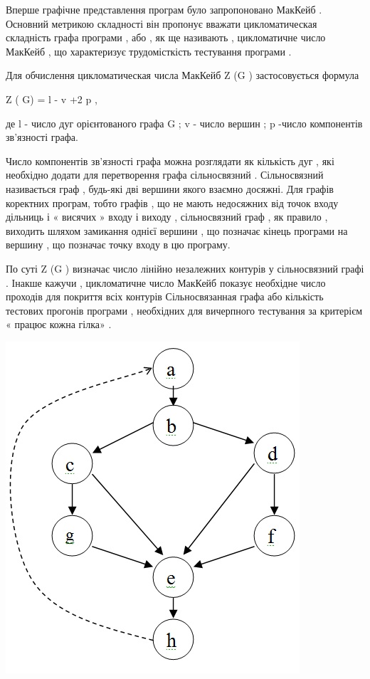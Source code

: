 \documentclass[oneside,final,14pt]{extreport}
\begin{document}
Вперше графічне представлення програм було запропоновано МакКейб . Основний метрикою складності він пропонує вважати цикломатическая складність графа програми , або , як ще називають , цикломатичне число МакКейб , що характеризує трудомісткість тестування програми .

Для обчислення цикломатическая числа МакКейб Z (G ) застосовується формула

Z ( G) = l - v +2 p ,

де l - число дуг орієнтованого графа G ; v - число вершин ; p -число компонентів зв'язності графа.

Число компонентів зв'язності графа можна розглядати як кількість дуг , які необхідно додати для перетворення графа сільносвязний . Сільносвязний називається граф , будь-які дві вершини якого взаємно досяжні. Для графів коректних програм, тобто графів , що не мають недосяжних від точок входу дільниць і « висячих » входу і виходу , сільносвязний граф , як правило , виходить шляхом замикання однієї вершини , що позначає кінець програми на вершину , що позначає точку входу в цю програму.

По суті Z (G ) визначає число лінійно незалежних контурів у сільносвязний графі . Інакше кажучи , цикломатичне число МакКейб показує необхідне число проходів для покриття всіх контурів Сільносвязанная графа або кількість тестових прогонів програми , необхідних для вичерпного тестування за критерієм « працює кожна гілка» .

\includegraphics{metrics_Mackkaib_1.jpg}
\end{document}
